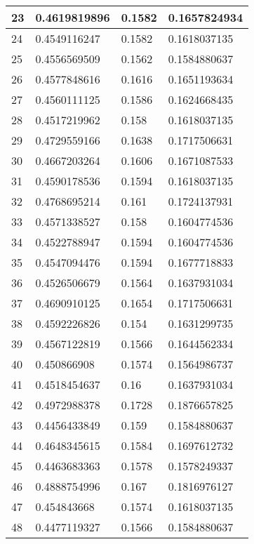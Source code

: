 \begin{table}[]
\begin{tabular}{|l|l|l|l|}
23    & 0.4619819896 & 0.1582       & 0.1657824934 \\ \hline
24    & 0.4549116247 & 0.1582       & 0.1618037135 \\ \hline
25    & 0.4556569509 & 0.1562       & 0.1584880637 \\ \hline
26    & 0.4577848616 & 0.1616       & 0.1651193634 \\ \hline
27    & 0.4560111125 & 0.1586       & 0.1624668435 \\ \hline
28    & 0.4517219962 & 0.158        & 0.1618037135 \\ \hline
29    & 0.4729559166 & 0.1638       & 0.1717506631 \\ \hline
30    & 0.4667203264 & 0.1606       & 0.1671087533 \\ \hline
31    & 0.4590178536 & 0.1594       & 0.1618037135 \\ \hline
32    & 0.4768695214 & 0.161        & 0.1724137931 \\ \hline
33    & 0.4571338527 & 0.158        & 0.1604774536 \\ \hline
34    & 0.4522788947 & 0.1594       & 0.1604774536 \\ \hline
35    & 0.4547094476 & 0.1594       & 0.1677718833 \\ \hline
36    & 0.4526506679 & 0.1564       & 0.1637931034 \\ \hline
37    & 0.4690910125 & 0.1654       & 0.1717506631 \\ \hline
38    & 0.4592226826 & 0.154        & 0.1631299735 \\ \hline
39    & 0.4567122819 & 0.1566       & 0.1644562334 \\ \hline
40    & 0.450866908  & 0.1574       & 0.1564986737 \\ \hline
41    & 0.4518454637 & 0.16         & 0.1637931034 \\ \hline
42    & 0.4972988378 & 0.1728       & 0.1876657825 \\ \hline
43    & 0.4456433849 & 0.159        & 0.1584880637 \\ \hline
44    & 0.4648345615 & 0.1584       & 0.1697612732 \\ \hline
45    & 0.4463683363 & 0.1578       & 0.1578249337 \\ \hline
46    & 0.4888754996 & 0.167        & 0.1816976127 \\ \hline
47    & 0.454843668  & 0.1574       & 0.1618037135 \\ \hline
48    & 0.4477119327 & 0.1566       & 0.1584880637 \\ \hline

\end{tabular}
\end{table}
